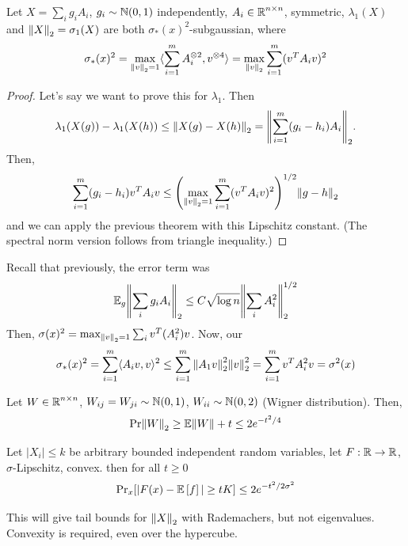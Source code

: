 \begin{corollary}
    Let $X = \sum_i g_i A_i$, $g_i \sim \operatorname{\mathbb{N}}(0, 1)$ independently, $A_i \in \operatorname{\mathbb{R}}^{n \times n}$, symmetric,
    $\lambda_1(X)$ and $\norm{X}_2 = \sigma_1(X)$ are both $\sigma_*(x)^2$-subgaussian,
    where
    \[ \sigma_*(x)^2 = \max_{\norm{v}_2 = 1} \langle \sum_{i = 1}^m A_i^{\otimes 2}, v^{\otimes 4} \rangle = \max_{\norm{v}_2} \sum_{i = 1}^{m} (v^T A_i v)^2 \]
    \begin{proof}
        Let's say we want to prove this for $\lambda_1$. Then 
        \[\lambda_1(X(g)) - \lambda_1(X(h)) \le \norm{X(g) - X(h)}_2 =  \norm{\sum_{i = 1}^m(g_i - h_i) A_i}_2.\]
        Then, 
        \[\sum_{i = 1}^{m} (g_i - h_i) v^T A_i v \le \qty(\max_{\norm{v}_2 = 1} \sum_{i = 1}^{m} (v^T A_i v)^{2})^{1/2} \norm{g - h}_2\]
        and we can apply the previous theorem with this Lipschitz constant.
        (The spectral norm version follows from triangle inequality.)
    \end{proof}
\end{corollary} 

Recall that previously, the error term was
\[ \mathbb{E}_g \norm{\sum_i g_i A_i}_2 \le C \sqrt{\log n} \norm{\sum_i A_i^2}_2^{1/2} \]
Then, $\sigma(x)^2 = \max_{\norm{v}_2 = 1} \sum_i v^T (A_i^2) v$.
Now, our 
\[ \sigma_*(x)^2 = \sum_{i = 1}^{m} \langle A_i v, v \rangle^2 \le \sum_{i = 1}^{m} \norm{A_1 v}_2^2 \norm{v}_2^2 = \sum_{i = 1}^{m} v^T A_i^2 v = \sigma^2 (x) \]

\begin{corollary}
    Let $W \in \operatorname{\mathbb{R}}^{n \times n}$, $W_{ij} = W_{ji} \sim \operatorname{\mathbb{N}}(0, 1)$, $W_{ii} \sim \operatorname{\mathbb{N}}(0, 2)$ (Wigner distribution).
    Then,
    \[ \textrm{Pr}{\norm{W}_2 \ge \mathbb{E}\norm{W} + t} \le 2e^{-t^2/4} \]
\end{corollary}

\begin{theorem}
    Let $|X_i| \le k$ be arbitrary bounded independent random variables, let $F: \operatorname{\mathbb{R}} \to \operatorname{\mathbb{R}}$, $\sigma$-Lipschitz, convex.
    then for all $t \ge 0$
    \[ \textrm{Pr}_x[|F(x) - \mathbb{E}\left[ f \right]| \ge tK] \le 2e^{-t^2/2\sigma^2} \]
\end{theorem}

This will give tail bounds for $\norm{X}_2$ with Rademachers, but not eigenvalues. Convexity is required,
even over the hypercube.

